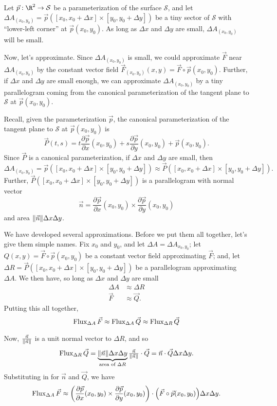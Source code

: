 Let $\vec p:\R^2\to\mathcal S$ be a parameterization of the surface $\mathcal S$,
and let $\Delta A_{(x_0,y_0)}=\vec p([x_0,x_0+\Delta x]\times [y_0,y_0+\Delta y])$
be a tiny sector of $\mathcal S$ with ``lower-left corner'' at $\vec p(x_0,y_0)$.
As long as $\Delta x$ and $\Delta y$ are small, $\Delta A_{(x_0,y_0)}$ will be
small.

Now, let's approximate.  Since $\Delta A_{(x_0,y_0)}$
is small, we could approximate $\vec F$ near $\Delta A_{(x_0,y_0)}$
by the constant vector 
field $\vec F_{(x_0,y_0)}(x,y) = \vec F\circ \vec p(x_0,y_0)$.  Further,
if $\Delta x$ and $\Delta y$ are small enough, we can approximate $\Delta A_{(x_0,y_0)}$
by a tiny parallelogram coming from the 
canonical parameterization of the tangent plane to $\mathcal S$ at $\vec p(x_0,y_0)$.

Recall, given the parameterization $\vec p$,
the canonical parameterization of the tangent plane to $\mathcal S$ at $\vec p(x_0,y_0)$
is
\[
	\vec P(t,s) = t \frac{\partial \vec p}{\partial x}(x_0,y_0) + 
	s\frac{\partial \vec p}{\partial y}(x_0,y_0)
	+\vec p(x_0,y_0).
\]
Since $\vec P$ is a canonical parameterization, if $\Delta x$ and $\Delta y$
are small, then 
\[
\Delta A_{(x_0,y_0)}=\vec p([x_0,x_0+\Delta x]\times [y_0,y_0+\Delta y])
\approx \vec P([x_0,x_0+\Delta x]\times [y_0,y_0+\Delta y]).
\]
Further, $\vec P([x_0,x_0+\Delta x]\times [y_0,y_0+\Delta y])$ is a parallelogram
with normal vector
\[
	\vec n = \frac{\partial \vec p}{\partial x}(x_0,y_0) \times
	\frac{\partial \vec p}{\partial y}(x_0,y_0)
\]
and area $\lVert\vec n\rVert\Delta x\Delta y$.

We have developed several approximations.  Before we put them all together, let's
give them simple names.  Fix $x_0$ and $y_0$,
and let $\Delta A=\Delta A_{x_0,y_0}$;
let $Q(x,y) = \vec F\circ \vec p(x_0,y_0)$ be a constant
vector field approximating $\vec F$; and, let 
$\Delta R=\vec P([x_0,x_0+\Delta x]\times [y_0,y_0+\Delta y])$ be a parallelogram
approximating $\Delta A$.  We then have, so long as $\Delta x$ and $\Delta y$ are small
\begin{align*}
	\Delta A &\approx \Delta R\\
	\vec F &\approx \vec Q.
\end{align*}
Putting this all together, 
\begin{align*}
	\operatorname{Flux}_{\Delta A}\vec F
	\approx \operatorname{Flux}_{\Delta A}\vec Q 
	\approx \operatorname{Flux}_{\Delta R}\vec Q
\end{align*}

Now, $\tfrac{\vec n}{\lVert\vec n\rVert}$ is a unit normal vector to $\Delta R$,
and so
\[
	\operatorname{Flux}_{\Delta R}\vec Q = 
	\underbrace{\lVert\vec n\rVert\Delta x\Delta y}_{\text{area of $\Delta R$}}\tfrac{\vec n}{\lVert\vec n\rVert}\cdot \vec Q
	=\vec n\cdot \vec Q\Delta x\Delta y.
\]
Substituting in for $\vec n$ and $\vec Q$, we have
\begin{equation}
	\label{EQFLUXAPPROX}
	\operatorname{Flux}_{\Delta A}\vec F
	\approx 
	\left(\frac{\partial \vec p}{\partial x}(x_0,y_0) \times
	\frac{\partial \vec p}{\partial y}(x_0,y_0)\right)
	\cdot \Big(\vec F\circ \vec p(x_0,y_0)\Big )\Delta x \Delta y.
\end{equation}


